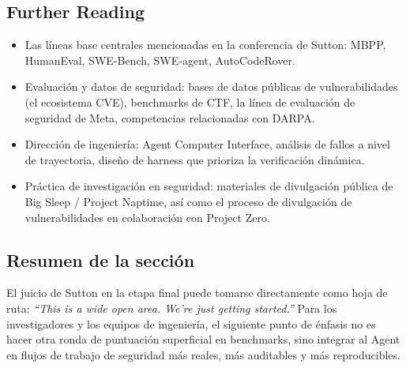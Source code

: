 \subsection{Further Reading}
\begin{itemize}
    \item Las líneas base centrales mencionadas en la conferencia de Sutton: MBPP, HumanEval, SWE-Bench, SWE-agent, AutoCodeRover.
    \item Evaluación y datos de seguridad: bases de datos públicas de vulnerabilidades (el ecosistema CVE), benchmarks de CTF, la línea de evaluación de seguridad de Meta, competencias relacionadas con DARPA.
    \item Dirección de ingeniería: Agent Computer Interface, análisis de fallos a nivel de trayectoria, diseño de harness que prioriza la verificación dinámica.
    \item Práctica de investigación en seguridad: materiales de divulgación pública de Big Sleep / Project Naptime, así como el proceso de divulgación de vulnerabilidades en colaboración con Project Zero.
\end{itemize}

\subsection{Resumen de la sección}
El juicio de Sutton en la etapa final puede tomarse directamente como hoja de ruta: \textit{``This is a wide open area. We're just getting started.''} Para los investigadores y los equipos de ingeniería, el siguiente punto de énfasis no es hacer otra ronda de puntuación superficial en benchmarks, sino integrar al Agent en flujos de trabajo de seguridad más reales, más auditables y más reproducibles.


